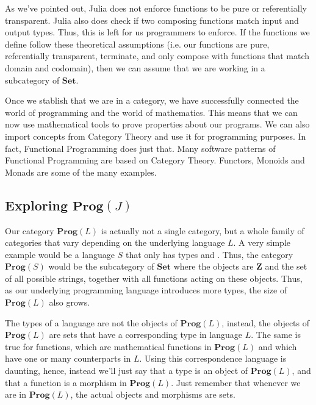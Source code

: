 As we've pointed out, Julia does not enforce functions to be pure or referentially transparent.
Julia also does check if two composing functions match input and output types. Thus, this is left
for us programmers to enforce. If the functions we define follow these theoretical assumptions
(i.e. our functions are pure, referentially transparent, terminate, and
only compose with functions that match domain and codomain), then we can assume that
we are working in a subcategory of $\mathbf{Set}$.

Once we stablish that we are in a category, we have successfully
connected the world of programming and the world of mathematics.
This means that we can now use mathematical tools to prove properties
about our programs. We can also import concepts from Category
Theory and use it for programming purposes. In fact, Functional Programming does just that.
Many software patterns of Functional Programming are based on Category Theory.
Functors, Monoids and Monads are some of the many examples.


\subsection{Exploring $\mathbf{Prog}(J)$}

Our category $\mathbf{Prog}(L)$ is actually not a single category, but a whole
family of categories that vary depending on the underlying language $L$.
A very simple example would be a language $S$ that only has types  and .
Thus, the category $\mathbf{Prog}(S)$ would be the subcategory of $\mathbf{Set}$
where the objects are $\mathbf Z$ and the set of all possible strings, together with
all functions acting on these objects.
Thus, as our underlying programming language introduces more types, the size of $\mathbf{Prog}(L)$
also grows.

\begin{note}
	The types of a language are not the objects of $\mathbf{Prog}(L)$, instead,
	the objects of $\mathbf{Prog}(L)$ are sets that have a corresponding type in language $L$.
	The same is true for functions, which are mathematical functions in $\mathbf{Prog}(L)$
	and which have one or many counterparts in $L$. Using this correspondence language
	is daunting, hence, instead we'll just say that a type  is an object of $\mathbf{Prog}(L)$,
	and that a function  is a morphism in $\mathbf{Prog}(L)$. Just remember
	that whenever we are in $\mathbf{Prog}(L)$, the actual objects and morphisms are sets.
\end{note}

